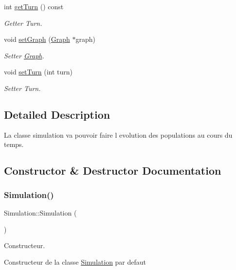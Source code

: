 \begin{DoxyCompactItemize}
int \mbox{\hyperlink{class_simulation_a21dc3e8afd771b9bfa58f88fdce1c998}{get\+Turn}} () const
\begin{DoxyCompactList}\small\item\em Getter Turn. \end{DoxyCompactList}\item 
void \mbox{\hyperlink{class_simulation_a72ce1eb4046e69378685ea0c46cc8448}{set\+Graph}} (\mbox{\hyperlink{class_graph}{Graph}} $\ast$graph)
\begin{DoxyCompactList}\small\item\em Setter \mbox{\hyperlink{class_graph}{Graph}}. \end{DoxyCompactList}\item 
void \mbox{\hyperlink{class_simulation_a0929f56d21b2e607e0dda8c7b9c97092}{set\+Turn}} (int turn)
\begin{DoxyCompactList}\small\item\em Setter Turn. \end{DoxyCompactList}\end{DoxyCompactItemize}


\subsection{Detailed Description}
La classe simulation va pouvoir faire l evolution des populations au cours du temps. 

\subsection{Constructor \& Destructor Documentation}
\mbox{\label{class_simulation_a5b224cc5b36bcc8eb29689aff223de41}} 
\subsubsection{\texorpdfstring{Simulation()}{Simulation()}\hspace{0.1cm}{\footnotesize\ttfamily [1/2]}}
{\footnotesize\ttfamily Simulation\+::\+Simulation (\begin{DoxyParamCaption}{ }\end{DoxyParamCaption})}



Constructeur. 

Constructeur de la classe \mbox{\hyperlink{class_simulation}{Simulation}} par defaut \mbox{\label{class_simulation_acac8de557d6db1b0c1ea78b8043b5271}} 
